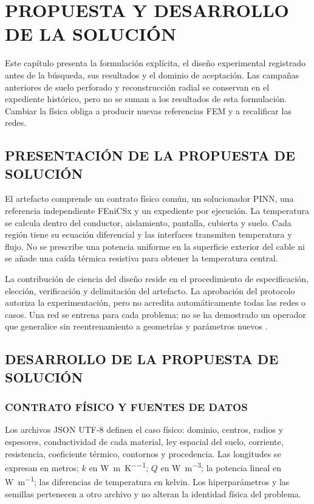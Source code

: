 ﻿\chapter{PROPUESTA Y DESARROLLO DE LA SOLUCIÓN}
\label{ch:propuesta-desarrollo}
\thispagestyle{empty}

Este capítulo presenta la formulación explícita, el diseño experimental registrado antes de la búsqueda, sus resultados y el dominio de aceptación. Las campañas anteriores de suelo perforado y reconstrucción radial se conservan en el expediente histórico, pero no se suman a los resultados de esta formulación. Cambiar la física obliga a producir nuevas referencias FEM y a recalificar las redes.

\section{PRESENTACIÓN DE LA PROPUESTA DE SOLUCIÓN}
\label{sec:presentacion-propuesta}

El artefacto comprende un contrato físico común, un solucionador PINN, una referencia independiente FEniCSx y un expediente por ejecución. La temperatura se calcula dentro del conductor, aislamiento, pantalla, cubierta y suelo. Cada región tiene su ecuación diferencial y las interfaces transmiten temperatura y flujo. No se prescribe una potencia uniforme en la superficie exterior del cable ni se añade una caída térmica resistiva para obtener la temperatura central.

La contribución de ciencia del diseño reside en el procedimiento de especificación, elección, verificación y delimitación del artefacto. La aprobación del protocolo autoriza la experimentación, pero no acredita automáticamente todas las redes o casos. Una red se entrena para cada problema; no se ha demostrado un operador que generalice sin reentrenamiento a geometrías y parámetros nuevos \parencites{peffers2007}{gregor2013}.

\section{DESARROLLO DE LA PROPUESTA DE SOLUCIÓN}
\label{sec:desarrollo-solucion}

\subsection{CONTRATO FÍSICO Y FUENTES DE DATOS}

Los archivos JSON UTF-8 definen el caso físico: dominio, centros, radios y espesores, conductividad de cada material, ley espacial del suelo, corriente, resistencia, coeficiente térmico, contornos y procedencia. Las longitudes se expresan en metros; $k$ en \si{\watt\per\metre\per\kelvin}; $Q$ en \si{\watt\per\metre\cubed}; la potencia lineal en \si{\watt\per\metre}; las diferencias de temperatura en kelvin. Los hiperparámetros y las semillas pertenecen a otro archivo y no alteran la identidad física del problema.

